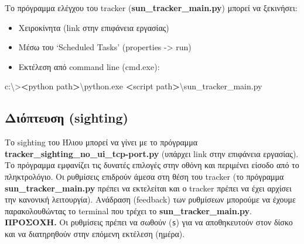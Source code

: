 \documentclass[
  a4paper,
  twoside,
  titlepage,
  11pt]{article}
\newenvironment{Shaded}{\begin{snugshade}}{\end{snugshade}}
\newcommand{\DataTypeTok}[1]{\textcolor[rgb]{0.13,0.29,0.53}{#1}}
\newcommand{\ExtensionTok}[1]{#1}
\newcommand{\NormalTok}[1]{#1}
\newcommand{\OperatorTok}[1]{\textcolor[rgb]{0.81,0.36,0.00}{\textbf{#1}}}
\providecommand{\tightlist}{%
  \setlength{\itemsep}{0pt}\setlength{\parskip}{0pt}}
\numberwithin{equation}{section}
\numberwithin{figure}{section}
\numberwithin{table}{section}
\begin{document}
\vspace{-0.6\baselineskip}

Το πρόγραμμα ελέγχου του tracker (\textbf{sun\_tracker\_main.py}) μπορεί να ξεκινήσει:

\begin{itemize}
\tightlist
\item
  Χειροκίνητα (link στην επιφάνεια εργασίας)
\item
  Μέσω του `Scheduled Tasks' (properties -\textgreater{} run)
\item
  Εκτέλεση από command line (cmd.exe):
\end{itemize}

\begin{Shaded}
\begin{Highlighting}[]
\ExtensionTok{c:\textbackslash{}\textgreater{}}\OperatorTok{\textless{}}\NormalTok{python path}\OperatorTok{\textgreater{}}\DataTypeTok{\textbackslash{}p}\NormalTok{ython.exe }\OperatorTok{\textless{}}\NormalTok{script path}\OperatorTok{\textgreater{}}\DataTypeTok{\textbackslash{}s}\NormalTok{un\_tracker\_main.py}
\end{Highlighting}
\end{Shaded}

\vspace{-1.05\baselineskip}

\hypertarget{ux3b4ux3b9ux3ccux3c0ux3c4ux3b5ux3c5ux3c3ux3b7-sighting}{%
\subsection*{Διόπτευση (sighting)}\label{ux3b4ux3b9ux3ccux3c0ux3c4ux3b5ux3c5ux3c3ux3b7-sighting}}

\vspace{-0.6\baselineskip}

Το sighting του Ήλιου μπορεί να γίνει με το πρόγραμμα \textbf{tracker\_sighting\_no\_ui\_tcp-port.py} (υπάρχει link στην επιφάνεια εργασίας).
Το πρόγραμμα εμφανίζει τις δυνατές επιλογές στην οθόνη και περιμένει είσοδο από το πληκτρολόγιο.
Οι ρυθμίσεις επιδρούν άμεσα στη θέση του tracker (το πρόγραμμα \textbf{sun\_tracker\_main.py} πρέπει να εκτελείται και ο tracker πρέπει να έχει αρχίσει την κανονική λειτουργία).
Ανάδραση (feedback) των ρυθμίσεων μπορούμε να έχουμε παρακολουθώντας το terminal που τρέχει το \textbf{sun\_tracker\_main.py}. \textbf{ΠΡΟΣΟΧΗ.} Οι ρυθμίσεις πρέπει να σωθούν (\texttt{\textquotesingle{}s\textquotesingle{}}) για να αποθηκευτούν στον δίσκο και να διατηρηθούν στην επόμενη εκτέλεση (ημέρα).
\end{document}

